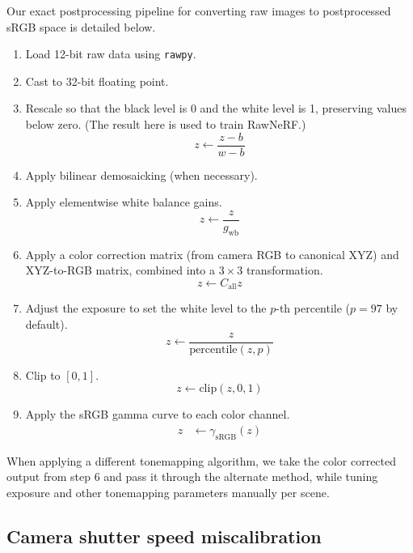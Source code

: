 Our exact postprocessing pipeline for converting raw images to postprocessed sRGB space is detailed below.
\begin{enumerate}
    \item Load 12-bit raw data using \texttt{rawpy}.
    \item Cast to 32-bit floating point.
    \item Rescale so that the black level is 0 and the white level is 1, preserving values below zero. (The result here is used to train RawNeRF.)
    \begin{equation}
        z \leftarrow \frac{z - b}{w - b}
    \end{equation} 
    \item Apply bilinear demosaicking (when necessary).
    \item Apply elementwise white balance gains.
    \begin{equation}
        z \leftarrow \frac{z}{g_{\mathrm{wb}}}
    \end{equation}
    \item Apply a color correction matrix (from camera RGB to canonical XYZ) and XYZ-to-RGB matrix, combined into a $3\times 3$ transformation.
    \begin{equation}
        z \leftarrow C_{\mathrm{all}} z
    \end{equation}
    \item Adjust the exposure to set the white level to the $p$-th percentile ($p=97$ by default).
    \begin{equation}
        z \leftarrow \frac{z}{\mathrm{percentile}(z, p)}
    \end{equation}
    \item Clip to $[0,1]$.
    \begin{equation}
        z \leftarrow \mathrm{clip}(z,0,1)
    \end{equation}
    \item Apply the sRGB gamma curve to each color channel.
    \begin{align}
        z &\leftarrow \gamma_\mathrm{sRGB}(z)
    \end{align}
\end{enumerate}
When applying a different tonemapping algorithm, we take the color corrected output from step 6 and pass it through the alternate method, while tuning exposure and other tonemapping parameters manually per scene.


\subsection{Camera shutter speed miscalibration}
\label{sec:miscalibration}

